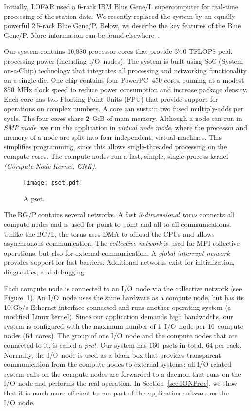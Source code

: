 \documentclass{sig-alternate}
\begin{document}
Initially, LOFAR used a 6-rack IBM Blue Gene/L supercomputer for real-time
processing of the station data.
We recently replaced the system by an equally powerful 2.5-rack Blue Gene/P.
Below, we describe the key features of the Blue Gene/P.
More information can be found elsewhere~\cite{IBM:08}.

Our system contains 10,880 processor cores that provide 37.0 TFLOPS peak
processing power (including I/O~nodes).
The system is built using SoC (System-on-a-Chip) technology that integrates
all processing and networking functionality on a single die.
One chip contains four PowerPC~450 cores, running at a modest 850~MHz clock
speed to reduce power consumption and increase package density.
Each core has two Floating-Point Units (FPU) that provide support for
operations on complex numbers.
A core can sustain two fused multiply-adds per cycle.
The four cores share 2~GiB of main memory.
Although a node can run in \emph{SMP mode}, we run the application in
\emph{virtual node mode}, where the processor and memory of a node are split
into four independent, virtual machines.
This simplifies programming, since this allows single-threaded processing
on the compute cores.  %
The compute nodes run a fast, simple, single-process kernel
\emph{(Compute Node Kernel, CNK)},

\begin{figure}[b]
\texttt{[image: pset.pdf]}
\caption{A pset.}
\label{fig:pset}
\end{figure}

The BG/P contains several networks.
A fast \emph{3-dimensional torus\/} connects all compute nodes and is used
for point-to-point and all-to-all communications.
Unlike the BG/L, the torus uses DMA to offload the CPUs and allows
asynchronous communication.
The \emph{collective network\/} is used for MPI collective operations,
but also for external communication.
A \emph{global interrupt network\/} provides support for fast barriers.
Additional networks exist for initialization, diagnostics, and debugging.

Each compute node is connected to an I/O~node via the collective network
(see Figure~\ref{fig:pset}).
An I/O~node uses the same hardware as a compute node, but has its 10 Gb/s Ethernet
interface connected and runs another operating system (a modified Linux kernel).
Since our application demands high bandwidths, our system is configured with
the maximum number of 1~I/O~node per 16~compute nodes (64~cores).
The group of one I/O~node and the compute nodes that are connected to it,
is called a \emph{pset}.
Our system has 160~psets in total, 64 per rack.
Normally, the I/O~node is used as a black box that provides transparent
communication from the compute nodes to external systems: all I/O-related
system calls on the compute nodes are forwarded to a daemon that runs
on the I/O~node and performs the real operation.
In Section~\ref{sec:IONProc}, we show that it is much more
efficient to run part of the application software on the I/O~node.
\end{document}
